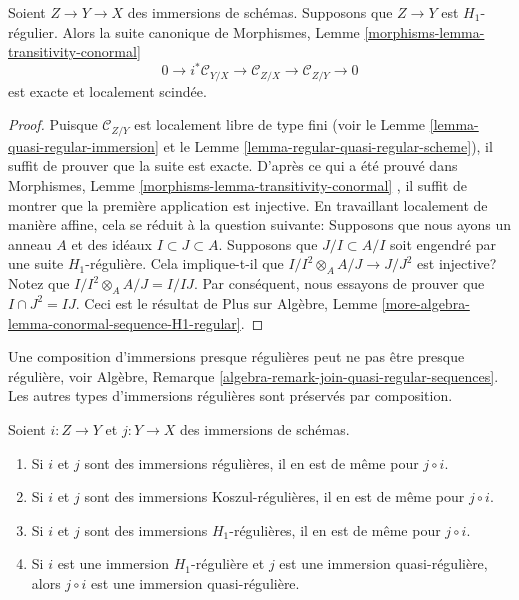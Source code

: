 \begin{lemma}
\label{lemma-transitivity-conormal-quasi-regular}
Soient  $Z \to Y \to X$  des immersions de schémas. Supposons que  $Z \to Y$  est
 $H_1$-régulier. Alors la suite canonique de Morphismes, Lemme  \ref{morphisms-lemma-transitivity-conormal}
$$
0 \to i^*\mathcal{C}_{Y/X} \to
\mathcal{C}_{Z/X} \to
\mathcal{C}_{Z/Y} \to 0
$$
est exacte et localement scindée.
\end{lemma}

\begin{proof}
Puisque  $\mathcal{C}_{Z/Y}$  est localement libre de type fini (voir le Lemme  \ref{lemma-quasi-regular-immersion} 
et le Lemme  \ref{lemma-regular-quasi-regular-scheme}), il suffit de prouver que la suite est exacte. D'après
ce qui a été prouvé dans Morphismes, Lemme  \ref{morphisms-lemma-transitivity-conormal} , il suffit de montrer que
la première application est injective. En travaillant localement de manière
affine, cela se réduit à la question suivante: Supposons que nous ayons un anneau
 $A$  et des idéaux  $I \subset J \subset A$. Supposons que  $J/I \subset A/I$  soit engendré
par une suite  $H_1$-régulière. Cela implique-t-il que  $I/I^2 \otimes_A A/J \to J/J^2$  est
injective? Notez que  $I/I^2 \otimes_A A/J = I/IJ$. Par conséquent, nous essayons de prouver que
 $I \cap J^2 = IJ$. Ceci est le résultat de Plus sur Algèbre, Lemme  \ref{more-algebra-lemma-conormal-sequence-H1-regular}.
\end{proof}

\noindent
Une composition d'immersions presque régulières peut ne pas être presque
régulière, voir Algèbre, Remarque  \ref{algebra-remark-join-quasi-regular-sequences}. Les autres types d'immersions
régulières sont préservés par composition.

\begin{lemma}
\label{lemma-composition-regular-immersion}
Soient  $i : Z \to Y$  et  $j : Y \to X$  des immersions de schémas.
\begin{enumerate}
\item Si  $i$  et  $j$  sont des immersions régulières, il en est de même
pour  $j \circ i$.
\item Si  $i$  et  $j$  sont des immersions Koszul-régulières, il en est
de même pour  $j \circ i$.
\item Si  $i$  et  $j$  sont des immersions  $H_1$-régulières, il en
est de même pour  $j \circ i$.
\item Si  $i$  est une immersion  $H_1$-régulière et  $j$  est une
immersion quasi-régulière, alors  $j \circ i$  est une immersion quasi-régulière.
\end{enumerate}
\end{lemma}

